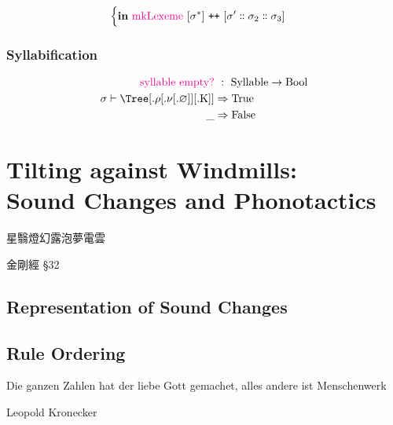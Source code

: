 \documentclass{report}[12pt]
\begin{document}
\begin{align*}
\begin{cases}
\begin{aligned}
                                                                                     & \textbf{in}\ \text{\textcolor{magenta}{mkLexeme}}\ [\sigma^{*}]\ \texttt{++}\ [\sigma' \dblcolon \sigma_2 \dblcolon \sigma_3] \\
                                                                                   \end{aligned} \\
                                                      \end{cases}
\end{align*}

\subsection{Syllabification}

\begin{align*}
  \text{\textcolor{magenta}{syllable empty?}} &\ :\ \text{Syllable} \rightarrow \text{Bool} \\
  \sigma \vdash \Tree [.\text{$\rho$} [.\text{$\nu$} [.\text{$\varnothing$} ] ] [.\text{K} ] ] & \Rightarrow \text{True} \\
  \_ & \Rightarrow \text{False} \\
\end{align*}

\chapter{Tilting against Windmills: \\ Sound Changes and Phonotactics}

\epigraph{星翳燈幻露泡夢電雲\footnotemark}{金剛經 \S32}

\section{Representation of Sound Changes}

\section{Rule Ordering}

\epigraph{Die ganzen Zahlen hat der liebe Gott gemachet, alles andere ist Menschenwerk}{Leopold Kronecker}
\end{document}
